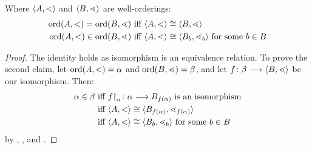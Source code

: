 \documentclass[../../../include/open-logic-section]{subfiles}
\begin{document}
\begin{cor}
Where $\langle A, < \rangle$ and $\langle B, \lessdot \rangle$ are well-orderings: 
\begin{align*}
	\ordtype{A, <} = \ordtype{B, \lessdot}&\text{ iff }\ordeq{\tuple{A, <}}{\tuple{B, \lessdot}}\\
	\ordtype{A, <} \in \ordtype{B, \lessdot}&\text{ iff }\ordeq{\tuple{A, <}}{\tuple{B_b, \lessdot_b}}\text{ for some }b \in B
\end{align*}
\end{cor}

\begin{proof}
The identity holds as isomorphism is an equivalence relation. To prove
the second claim, let $\mathrm{ord}(A, <) = \alpha$ and $\mathrm{ord}(B,
\lessdot) = \beta$, and let $f \colon \beta \longrightarrow \langle B, \lessdot \rangle$
be our isomorphism. Then:
\begin{align*}
	\alpha \in \beta&\text{ iff }\funrestrictionto{f}{\alpha} \colon \alpha \to B_{f(\alpha)}\text{ is an isomorphism}\\
	&\text{ iff }\ordeq{\tuple{A, <}}{\tuple{B_{f(\alpha)}, \lessdot_{f(\alpha)}}}\\
	&\text{ iff }\ordeq{\tuple{A, <}}{\tuple{B_b, \lessdot_b}}\text{ for some $b \in B$}
\end{align*}
by ,
, and
.
\end{proof}
\end{document}
